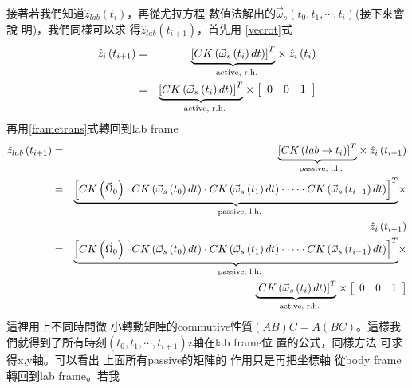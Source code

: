 \documentclass[12pt,twoside]{article}
\begin{document}
接著若我們知道$\hat{z}_{lab}\left(
t_{i}\right) $，再從尤拉方程%
數值法解出的$\vec{\omega}_{s}\left(
t_{0},t_{1},\cdots ,t_{i}\right) $(接下來會說%
明)，我們同樣可以求%
得$\hat{z}_{lab}\left( t_{i+1}\right) $，首先用%
\ref{vecrot}式%
\begin{eqnarray}
\hat{z}_{i}\left( t_{i+1}\right)  &=&\underset{\text{active, r.h.}}{%
\underbrace{\left[ CK\left( \vec{\omega}_{s}\left( t_{i}\right) dt\right) %
\right] ^{T}}}\times \hat{z}_{i}\left( t_{i}\right)   \label{iterateeq} \\
&=&\underset{\text{active, r.h.}}{\underbrace{\left[ CK\left( \vec{\omega}%
_{s}\left( t_{i}\right) dt\right) \right] ^{T}}}\times \left[ 
\begin{array}{ccc}
0 & 0 & 1%
\end{array}%
\right]   \notag
\end{eqnarray}%
再用\ref{frametrans}式轉回到lab frame%
\begin{eqnarray*}
\hat{z}_{lab}\left( t_{i+1}\right)  &=&\underset{\text{passive, l.h.}}{%
\underbrace{\left[ CK\left( lab\rightarrow t_{i}\right) \right] ^{T}}}\times 
\hat{z}_{i}\left( t_{i+1}\right)  \\
&=&\underset{\text{passive, l.h.}}{\underbrace{\left[ CK\left( \vec{\Omega}%
_{0}\right) \cdot CK\left( \vec{\omega}_{s}\left( t_{0}\right) dt\right)
\cdot CK\left( \vec{\omega}_{s}\left( t_{1}\right) dt\right) \cdot \cdots
\cdot CK\left( \vec{\omega}_{s}\left( t_{i-1}\right) dt\right) \right] ^{T}}}%
\times  \\
&&\hat{z}_{i}\left( t_{i+1}\right)  \\
&=&\underset{\text{passive, l.h.}}{\underbrace{\left[ CK\left( \vec{\Omega}%
_{0}\right) \cdot CK\left( \vec{\omega}_{s}\left( t_{0}\right) dt\right)
\cdot CK\left( \vec{\omega}_{s}\left( t_{1}\right) dt\right) \cdot \cdots
\cdot CK\left( \vec{\omega}_{s}\left( t_{i-1}\right) dt\right) \right] ^{T}}}%
\times  \\
&&\underset{\text{active, r.h.}}{\underbrace{\left[ CK\left( \vec{\omega}%
_{s}\left( t_{i}\right) dt\right) \right] ^{T}}}\times \left[ 
\begin{array}{ccc}
0 & 0 & 1%
\end{array}%
\right] 
\end{eqnarray*}%
這裡用上不同時間微%
小轉動矩陣的commutive性質$%
\left( AB\right) C=A\left( BC\right) $。這樣我%
們就得到了所有時刻$%
\left( t_{0},t_{1},\cdots ,t_{i+1}\right) $z軸在lab frame位%
置的公式，同樣方法%
可求得x,y軸。可以看出%
上面所有passive的矩陣的%
作用只是再把坐標軸%
從body frame轉回到lab frame。若我%
\end{document}
